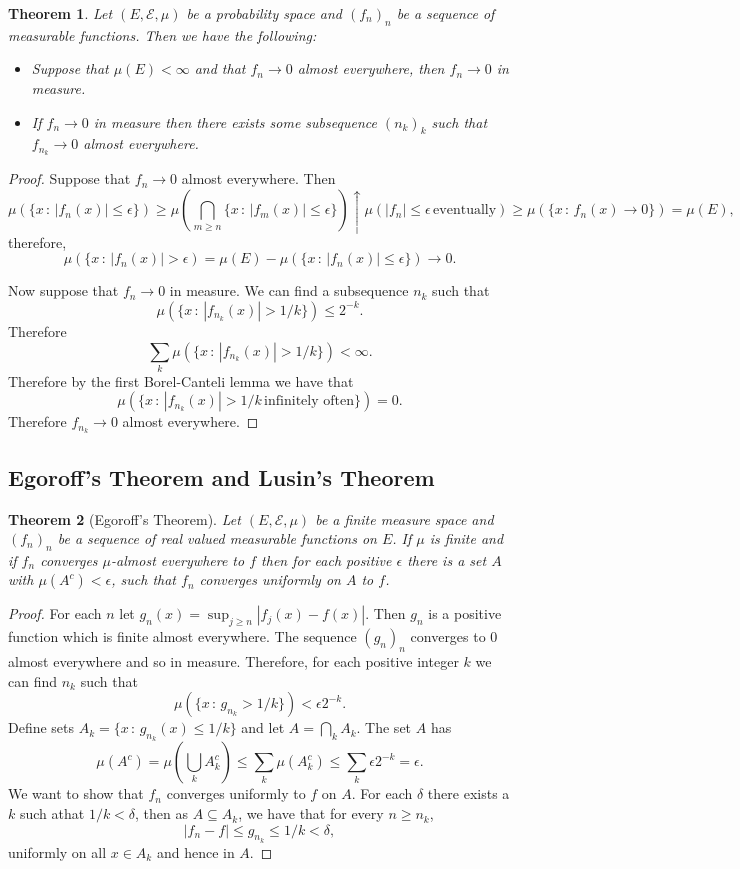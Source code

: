 \documentclass[11pt]{article}
\newtheorem{thm}{Theorem}[section]
\theoremstyle{definition}
\theoremstyle{remark}
\begin{document}
\begin{thm}
Let $(E, \mathcal{E}, \mu)$ be a probability space and $(f_n)_n$ be a sequence of measurable functions. Then we have the following:
\begin{itemize}
\item Suppose that $\mu(E) < \infty$ and that $f_n \rightarrow 0$ almost everywhere, then $f_n \rightarrow 0$ in measure.
\item If $f_n \rightarrow 0$ in measure then there exists some subsequence $(n_k)_k$ such that $f_{n_k} \rightarrow 0$ almost everywhere.
\end{itemize}
\end{thm}
\begin{proof}
Suppose that $f_n \rightarrow 0$ almost everywhere. Then 
\[ \mu(\{ x\,:\, |f_n(x)| \leq \epsilon \}) \geq \mu \left( \bigcap_{m \geq n} \{ x \,:\, |f_m(x)| \leq \epsilon\}\right) \uparrow \mu \left(|f_n| \leq \epsilon \, \mbox{eventually} \right) \geq \mu(\{ x \,:\, f_n(x) \rightarrow 0\}) = \mu(E), \] therefore,
\[ \mu(\{ x\,:\, |f_n(x)|> \epsilon) = \mu(E) - \mu(\{ x\,:\, |f_n(x)| \leq \epsilon \}) \rightarrow 0. \]

Now suppose that $f_n \rightarrow 0$ in measure. We can find a subsequence $n_k$ such that
\[ \mu(\{ x \,:\, |f_{n_k}(x)| > 1/k \}) \leq 2^{-k}. \] Therefore
\[ \sum_k \mu(\{ x \,:\, |f_{n_k}(x)| > 1/k \})<\infty.\] Therefore by the first Borel-Canteli lemma we have that
\[ \mu \left(\{ x\,:\, |f_{n_k}(x)|>1/k \, \mbox{infinitely often}\} \right) = 0. \] Therefore $f_{n_k} \rightarrow 0$ almost everywhere.
\end{proof}

\subsection{Egoroff's Theorem and Lusin's Theorem}
\begin{thm}[Egoroff's Theorem]
Let $(E, \mathcal{E}, \mu)$ be a finite measure space and $(f_n)_n$ be a sequence of real valued measurable functions on $E$. If $\mu$ is finite and if $f_n$ converges $\mu$-almost everywhere to $f$ then for each positive $\epsilon$ there is a set $A$ with $\mu(A^c)< \epsilon$, such that $f_n$ converges uniformly on $A$ to $f$.
\end{thm}
\begin{proof}
For each $n$ let $g_n(x) = \sup_{j \geq n}|f_j(x)-f(x)|$. Then $g_n$ is a positive function which is finite almost everywhere. The sequence $(g_n)_n$ converges to 0 almost everywhere and so in measure. Therefore, for each positive integer $k$ we can find $n_k$ such that
\[ \mu \left( \{ x \,:\, g_{n_k} > 1/k \} \right) < \epsilon 2^{-k}.  \] Define sets $A_k = \{ x\,:\, g_{n_k}(x) \leq 1/k\}$ and let $A= \bigcap_k A_k$. The set $A$ has
\[ \mu(A^c) = \mu \left( \bigcup_k A_k^c \right) \leq \sum_k \mu(A_k^c) \leq \sum_k \epsilon 2^{-k} = \epsilon. \] We want to show that $f_n$ converges uniformly to $f$ on $A$. For each $\delta$ there exists a $k$ such athat $1/k < \delta$, then as $A \subseteq A_k$, we have that for every $n \geq n_k$,
\[ |f_n - f| \leq g_{n_k} \leq 1/k < \delta, \] uniformly on all $x \in A_k$ and hence in $A$.
\end{proof}
\end{document}
